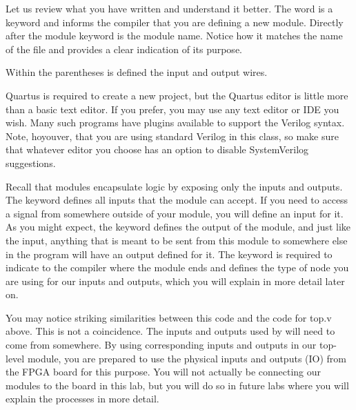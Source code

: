 \documentclass[12pt]{labmanual}
\begin{document}
Let us review what you have written and understand it better. The word  is a keyword and informs the compiler that you are defining a new module. Directly after the module keyword is the module name. Notice how it matches the name of the file and provides a clear indication of its purpose.
\begin{paracol}{2}
  Within the parentheses is defined the input and output wires. 
\switchcolumn[1]
\vspace{8em}
\begin{extra}[frametitle={A note about code editors}]
    Quartus is required to create a new project, but the Quartus editor is little more than a basic text editor. If you prefer, you may use any text editor or IDE you wish. Many such programs have plugins available to support the Verilog syntax. Note, hoyouver, that you are using standard Verilog in this class, so make sure that whatever editor you choose has an option to disable SystemVerilog suggestions.
\end{extra}
\switchcolumn[0]
\noindent
Recall that modules encapsulate logic by exposing only the inputs and outputs. The keyword  defines all inputs that the module can accept. If you need to access a signal from somewhere outside of your module, you will define an input for it. As you might expect, the keyword  defines the output of the module, and just like the input, anything that is meant to be sent from this module to somewhere else in the program will have an output defined for it. The keyword  is required to indicate to the compiler where the module ends and  defines the type of node you are using for our inputs and outputs, which you will explain in more detail later on.
\end{paracol}
You may notice striking similarities between this code and the code for top.v above. This is not a coincidence. The inputs and outputs used by  will need to come from somewhere. By using corresponding inputs and outputs in our top-level module, you are prepared to use the physical inputs and outputs (IO) from the FPGA board for this purpose. You will not actually be connecting our modules to the board in this lab, but you will do so in future labs where you will explain the processes in more detail.
\end{document}
